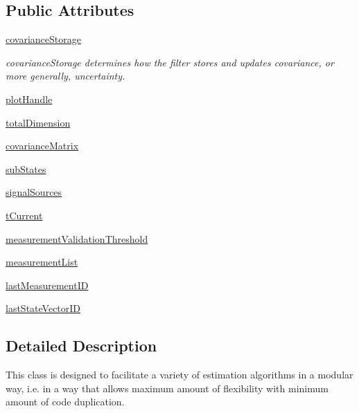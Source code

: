 \subsection*{Public Attributes}
\begin{DoxyCompactItemize}
\item 
\hyperlink{classmodest_1_1modularfilter_1_1ModularFilter_a96114547940eb463174477fe4612c999}{covariance\+Storage}
\begin{DoxyCompactList}\small\item\em covariance\+Storage determines how the filter stores and updates covariance, or more generally, uncertainty. \end{DoxyCompactList}\item 
\hyperlink{classmodest_1_1modularfilter_1_1ModularFilter_a2945291a2115aba2680a7c1a1cf728fc}{plot\+Handle}
\item 
\hyperlink{classmodest_1_1modularfilter_1_1ModularFilter_ae7028964e7e7adf58d75b76aef9783f6}{total\+Dimension}
\item 
\hyperlink{classmodest_1_1modularfilter_1_1ModularFilter_ac1b2e8a44ee25a8a2935e6e44a8409e5}{covariance\+Matrix}
\item 
\hyperlink{classmodest_1_1modularfilter_1_1ModularFilter_a80c66c525d5afd61271f13da47148c5d}{sub\+States}
\item 
\hyperlink{classmodest_1_1modularfilter_1_1ModularFilter_a545ac50ec6f67f29ad3420cfc5581812}{signal\+Sources}
\item 
\hyperlink{classmodest_1_1modularfilter_1_1ModularFilter_a917f511b39632b804f3ecf667f5a6d96}{t\+Current}
\item 
\hyperlink{classmodest_1_1modularfilter_1_1ModularFilter_af91295c2d8f45afe04386215b5fa39aa}{measurement\+Validation\+Threshold}
\item 
\hyperlink{classmodest_1_1modularfilter_1_1ModularFilter_a691b2974939eedf436beea187b0714dd}{measurement\+List}
\item 
\hyperlink{classmodest_1_1modularfilter_1_1ModularFilter_adc22328f3634e2b7bdeff883a7398538}{last\+Measurement\+ID}
\item 
\hyperlink{classmodest_1_1modularfilter_1_1ModularFilter_ab68eefa9ffabb7f9b4b4622fd7686fa0}{last\+State\+Vector\+ID}
\end{DoxyCompactItemize}


\subsection{Detailed Description}
This class is designed to facilitate a variety of estimation algorithms in a modular way, i.\+e. in a way that allows maximum amount of flexibility with minimum amount of code duplication.

